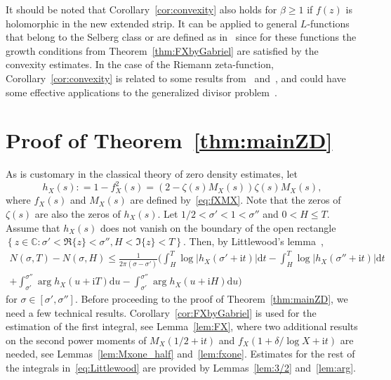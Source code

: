 \documentclass[a4paper,reqno]{amsart}
\theoremstyle{definition}
\newcommand{\C}{\mathbb{C}}
\newcommand{\de}[0]{\mathrel{\mathop:}=}
\newcommand{\ie}[0]{\mathrm{i}}
\newcommand{\dif}[1]{\mathrm{d}#1}
\begin{document}
It should be noted that Corollary~\ref{cor:convexity} also holds for $\beta\geq 1$ if $f(z)$ is holomorphic in the new extended strip. It can be applied to general $L$-functions that belong to the Selberg class or are defined as in~\cite[Chapter~5]{IKANT} since for these functions the growth conditions from Theorem~\ref{thm:FXbyGabriel} are satisfied by the convexity estimates. In the case of the Riemann zeta-function, Corollary~\ref{cor:convexity} is related to some results from~\cite[Sections~8.2 and~8.5]{Ivic} and~\cite[Section~7.8]{titchmarsh1986theory}, and could have some effective applications to the generalized divisor problem~\cite{BellottiYang}.

\section{Proof of Theorem~\ref{thm:mainZD}}
\label{sec:ProofThm1}

As is customary in the classical theory of zero density estimates, let
\[
h_{X}(s) \de 1-f_{X}^2(s) = \left(2-\zeta(s)M_{X}(s)\right)\zeta(s)M_{X}(s),
\]
where $f_X(s)$ and $M_X(s)$ are defined by~\eqref{eq:fXMX}. Note that the zeros of $\zeta(s)$ are also the zeros of $h_{X}(s)$. Let $1/2<\sigma'<1<\sigma''$ and $0<H\leq T$. Assume that $h_{X}(s)$ does not vanish on the boundary of the open rectangle $\left\{z\in\C\colon \sigma'<\Re\{z\}<\sigma'',H<\Im\{z\}<T\right\}$. Then, by Littlewood's lemma~\cite[Section~9.9]{titchmarsh1986theory},
\begin{multline}
\label{eq:Littlewood}
N(\sigma,T)-N(\sigma,H) \leq \frac{1}{2\pi\left(\sigma-\sigma'\right)}\Biggl(\int_{H}^{T}\log{\left|h_{X}\left(\sigma'+\ie t\right)\right|}\dif{t}-\int_{H}^{T}\log{\left|h_{X}\left(\sigma''+\ie t\right)\right|}\dif{t} \\
+\int_{\sigma'}^{\sigma''}\arg{h_{X}\left(u+\ie T\right)}\dif{u}-\int_{\sigma'}^{\sigma''}\arg{h_{X}\left(u+\ie H\right)}\dif{u}\Biggr)
\end{multline}
for $\sigma\in\left[\sigma',\sigma''\right]$. Before proceeding to the proof of Theorem~\ref{thm:mainZD}, we need a few technical results. Corollary~\ref{cor:FXbyGabriel} is used for the estimation of the first integral, see Lemma~\ref{lem:FX}, where two additional results on the second power moments of $M_X(1/2+\ie t)$ and $f_X(1+\delta/\log{X}+\ie t)$ are needed, see Lemmas~\ref{lem:Mxone_half} and~\ref{lem:fxone}. Estimates for the rest of the integrals in~\eqref{eq:Littlewood} are provided by Lemmas~\ref{lem:3/2} and~\ref{lem:arg}.
\end{document}
